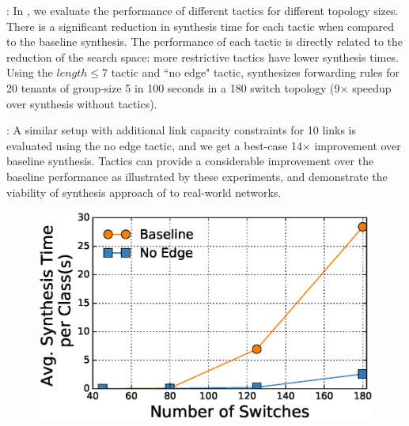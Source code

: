 : 
In ,
 we evaluate the performance of different tactics for different topology sizes. There is a
 significant reduction in synthesis time for each tactic when compared to the baseline synthesis.
 The performance of each tactic is directly related to the reduction of the search space: more
 restrictive tactics have lower synthesis times. 
  Using the $length \leq 7$ tactic and ``no edge" tactic, \Name synthesizes forwarding rules for 20 tenants of group-size 5 in 100 seconds in a 180 switch
 topology (9$\times$ speedup over synthesis without tactics).
  
 : A similar setup
 with additional link capacity constraints for 10 links is evaluated
 using the no edge tactic, and we get a best-case 14$\times$
 improvement over baseline synthesis. 
 Tactics can provide a considerable improvement
 over the baseline performance as illustrated by these experiments,
 and demonstrate the viability of synthesis approach of \Name to
 real-world networks.
 
\begin{figure}
	\centering
	\includegraphics[width=0.65\columnwidth]{figures/linkTopology.eps}
	\label{fig:link-capacity}
\end{figure}

